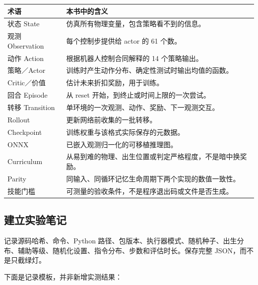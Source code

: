\documentclass[
  chinese,
  11pt,
  letterpaper,
]{article}
\newcounter{none} %
\begin{document}
{\def\LTcaptype{none} %
\begin{longtable}[]{@{}
  >{\raggedright\arraybackslash}p{}
  >{\raggedright\arraybackslash}p{}@{}}
\toprule\noalign{}
\begin{minipage}[b]{\linewidth}\raggedright
术语
\end{minipage} & \begin{minipage}[b]{\linewidth}\raggedright
本书中的含义
\end{minipage} \\
\midrule\noalign{}
\endhead
\bottomrule\noalign{}
\endlastfoot
状态 State & 仿真所有物理变量，包含策略看不到的信息。 \\
观测 Observation & 每个控制步提供给 actor 的 61 个数。 \\
动作 Action & 根据机器人控制合同解释的 14 个策略输出。 \\
策略／Actor & 训练时产生动作分布、确定性测试时输出均值的函数。 \\
Critic／价值 & 估计未来折扣奖励，用于训练。 \\
回合 Episode & 从 reset 开始，到终止或时间上限的一次尝试。 \\
转移 Transition & 单环境的一次观测、动作、奖励、下一观测交互。 \\
Rollout & 更新网络前收集的一批转移。 \\
Checkpoint & 训练权重与该格式实际保存的元数据。 \\
ONNX & 已嵌入观测归一化的可移植推理图。 \\
Curriculum & 从易到难的物理、出生位置或判定严格程度，不是暗中换奖励。 \\
Parity & 同输入、同循环记忆生命周期下两个实现的数值一致性。 \\
技能门槛 & 可测量的验收条件，不是程序退出码或文件是否生成。 \\
\end{longtable}
}

\subsection{建立实验笔记}\label{ux5efaux7acbux5b9eux9a8cux7b14ux8bb0}

记录源码哈希、命令、Python
路径、包版本、执行器模式、随机种子、出生分布、辅助等级、随机化设置、指令分布、步数和评估时长。保存完整
JSON，而不是只截绿灯。

下面是记录模板，并非新增实测结果：
\end{document}
